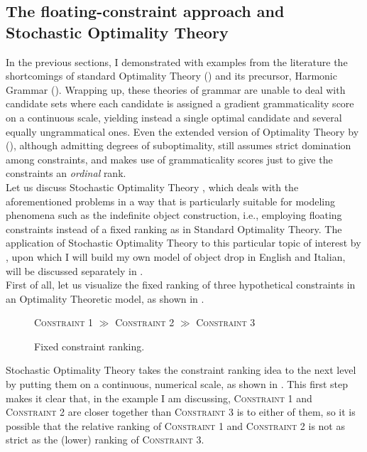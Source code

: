 \subsection{The floating-constraint approach and Stochastic Optimality Theory}  %

In the previous sections, I demonstrated with examples from the literature the shortcomings of standard Optimality Theory () and its precursor, Harmonic Grammar (). Wrapping up, these theories of grammar are unable to deal with candidate sets where each candidate is assigned a gradient grammaticality score on a continuous scale, yielding instead a single optimal candidate and several equally ungrammatical ones. Even the extended version of Optimality Theory by \textcite{keller1997extraction} (), although admitting degrees of suboptimality, still assumes strict domination among constraints, and makes use of grammaticality scores just to give the constraints an \textit{ordinal} rank.\\
Let us discuss Stochastic Optimality Theory \parencite{BoersmaHayes2001empirical, boersma1997we}, which deals with the aforementioned problems in a way that is particularly suitable for modeling phenomena such as the indefinite object construction, i.e., employing floating constraints instead of a fixed ranking as in Standard Optimality Theory. The application of Stochastic Optimality Theory to this particular topic of interest by \textcite{Medina2007}, upon which I will build my own model of object drop in English and Italian, will be discussed separately in .\\
First of all, let us visualize the fixed ranking of three hypothetical constraints in an Optimality Theoretic model, as shown in . 

\begin{figure}[htb]
\caption{Fixed constraint ranking.}
\textsc{Constraint 1} $\gg$ \textsc{Constraint 2} $\gg$ \textsc{Constraint 3}
\end{figure}

Stochastic Optimality Theory takes the constraint ranking idea to the next level by putting them on a continuous, numerical scale, as shown in . This first step makes it clear that, in the example I am discussing, \textsc{Constraint 1} and \textsc{Constraint 2} are closer together than \textsc{Constraint 3} is to either of them, so it is possible that the relative ranking of \textsc{Constraint 1} and \textsc{Constraint 2} is not as strict as the (lower) ranking of \textsc{Constraint 3}.

